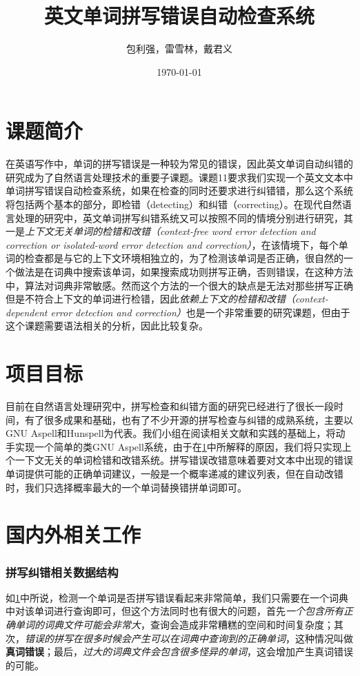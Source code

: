 \documentclass[UTF8,a4paper]{ctexart}
\title{英文单词拼写错误自动检查系统}
\author{包利强，雷雪林，戴君义}
\date{\today}
\begin{document}
\maketitle
\tableofcontents

\clearpage
\section{课题简介}
\label{intro}
在英语写作中，单词的拼写错误是一种较为常见的错误，因此英文单词自动纠错的研究成为了自然语言处理技术的重要子课题。课题11要求我们实现一个英文文本中单词拼写错误自动检查系统，如果在检查的同时还要求进行纠错错，那么这个系统将包括两个基本的部分，即检错（detecting）和纠错（correcting）。在现代自然语言处理的研究中，英文单词拼写纠错系统又可以按照不同的情境分别进行研究，其一是\textit{上下文无关单词的检错和改错（context-free word error detection and correction or isolated-word error detection and correction）}，在该情境下，每个单词的检查都是与它的上下文环境相独立的，为了检测该单词是否正确，很自然的一个做法是在词典中搜索该单词，如果搜索成功则拼写正确，否则错误，在这种方法中，算法对词典非常敏感。然而这个方法的一个很大的缺点是无法对那些拼写正确但是不符合上下文的单词进行检错，因此\textit{依赖上下文的检错和改错（context-dependent error detection and correction）}也是一个非常重要的研究课题，但由于这个课题需要语法相关的分析，因此比较复杂\cite{deorowicz2005correcting}。

\section{项目目标}
\label{target}
目前在自然语言处理研究中，拼写检查和纠错方面的研究已经进行了很长一段时间，有了很多成果和基础，也有了不少开源的拼写检查与纠错的成熟系统，主要以GNU Aspell和Hunspell为代表。我们小组在阅读相关文献和实践的基础上，将动手实现一个简单的类GNU Aspell系统，由于在\ref{intro}中所解释的原因，我们将只实现上个一下文无关的单词检错和改错系统。拼写错误改错意味着要对文本中出现的错误单词提供可能的正确单词建议，一般是一个概率递减的建议列表，但在自动改错时，我们只选择概率最大的一个单词替换错拼单词即可。

\section{国内外相关工作}
\label{related}

\subsubsection{拼写纠错相关数据结构}
\label{detection}
如\ref{intro}中所说，检测一个单词是否拼写错误看起来非常简单，我们只需要在一个词典中对该单词进行查询即可，但这个方法同时也有很大的问题，首先\textit{一个包含所有正确单词的词典文件可能会非常大}，查询会造成非常糟糕的空间和时间复杂度；其次，\textit{错误的拼写在很多时候会产生可以在词典中查询到的正确单词}，这种情况叫做\textbf{真词错误}；最后，\textit{过大的词典文件会包含很多怪异的单词}，这会增加产生真词错误的可能。
\end{document}
